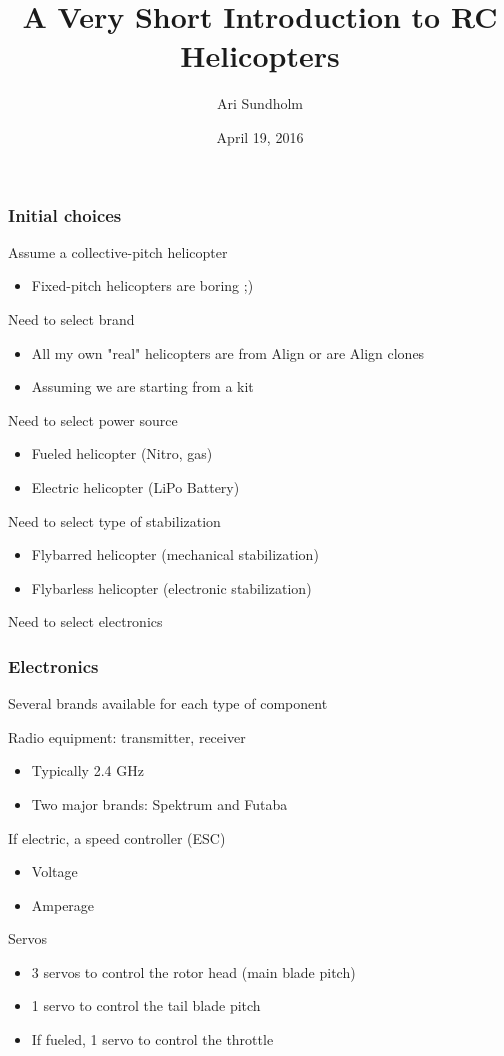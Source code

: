 \documentclass{beamer}
\title{A Very Short Introduction to RC Helicopters}
\author{Ari Sundholm}
\date{April 19, 2016}
\begin{document}
 
\frame{\titlepage}

\begin{frame}
\frametitle{Initial choices}

Assume a collective-pitch helicopter
\begin{itemize}
	\item Fixed-pitch helicopters are boring ;)
\end{itemize}

Need to select brand
\begin{itemize}
	\item All my own "real" helicopters are from Align or are Align clones
	\item Assuming we are starting from a kit
\end{itemize}

Need to select power source
\begin{itemize}
	\item Fueled helicopter (Nitro, gas)
	\item Electric helicopter (LiPo Battery)
\end{itemize}

Need to select type of stabilization
\begin{itemize}
	\item Flybarred helicopter (mechanical stabilization)
	\item Flybarless helicopter (electronic stabilization)
\end{itemize}

Need to select electronics

\end{frame}

\begin{frame}
\frametitle{Electronics}

Several brands available for each type of component

Radio equipment: transmitter, receiver
\begin{itemize}
	\item Typically 2.4 GHz
	\item Two major brands: Spektrum and Futaba
\end{itemize}

If electric, a speed controller (ESC)
\begin{itemize}
	\item Voltage
	\item Amperage
\end{itemize}

Servos
\begin{itemize}
	\item 3 servos to control the rotor head (main blade pitch)
	\item 1 servo to control the tail blade pitch
	\item If fueled, 1 servo to control the throttle
\end{itemize}

\end{frame}
\end{document}
